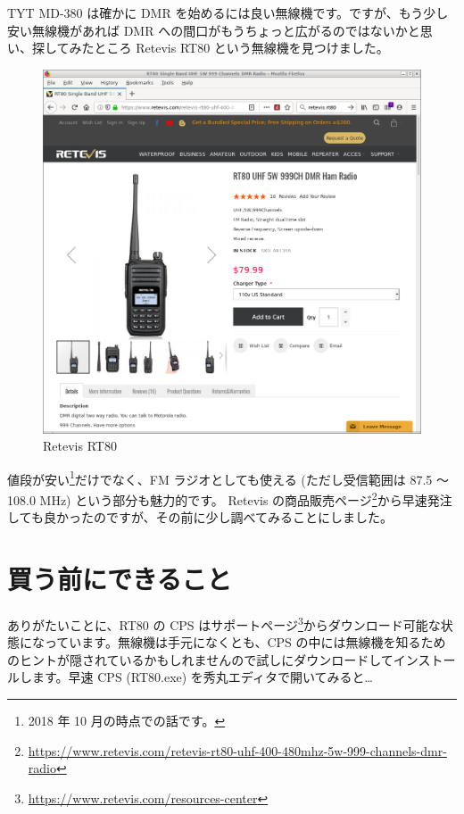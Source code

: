 \documentclass[a4j,oneside]{ujbook}
\begin{document}
TYT MD-380 は確かに DMR を始めるには良い無線機です。ですが、もう少し安い無線機があれば DMR への間口がもうちょっと広がるのではないかと思い、探してみたところ Retevis RT80 という無線機を見つけました。

\begin{figure}[H]
 \centering
 \includegraphics[width=15cm]{img/rt80-web.png}
 \caption{Retevis RT80}
\end{figure}

値段が安い\footnote{2018 年 10 月の時点での話です。}だけでなく、FM ラジオとしても使える (ただし受信範囲は 87.5 〜 108.0 MHz) という部分も魅力的です。
Retevis の商品販売ページ\footnote{\url{https://www.retevis.com/retevis-rt80-uhf-400-480mhz-5w-999-channels-dmr-radio}}から早速発注しても良かったのですが、その前に少し調べてみることにしました。

\section{買う前にできること}

ありがたいことに、RT80 の CPS はサポートページ\footnote{\url{https://www.retevis.com/resources-center}}からダウンロード可能な状態になっています。無線機は手元になくとも、CPS の中には無線機を知るためのヒントが隠されているかもしれませんので試しにダウンロードしてインストールします。早速 CPS (RT80.exe) を秀丸エディタで開いてみると…
\end{document}
